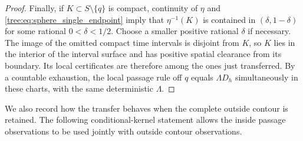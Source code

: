 \begin{proof}
Finally, if $K\subset S\setminus\{q\}$ is compact, continuity of $\eta$
and \eqref{tree:eq:sphere_single_endpoint} imply that
$\eta^{-1}(K)$ is contained in $(\delta,1-\delta)$ for some rational
$0<\delta<1/2$. Choose a smaller positive rational $\delta$ if necessary.
The image of the omitted
compact time intervals is disjoint from $K$, so $K$ lies in the interior
of the interval surface and has positive spatial clearance from its
boundary.  Its local certificates are therefore among the ones just
transferred. By a countable exhaustion, the local passage rule off $q$
equals $\Lambda D_h$ simultaneously in these charts, with the same
deterministic $\Lambda$.

\end{proof}

We also record how the transfer behaves when the complete outside
contour is retained. The following conditional-kernel statement allows
the inside passage observations to be used jointly with outside
contour observations.


